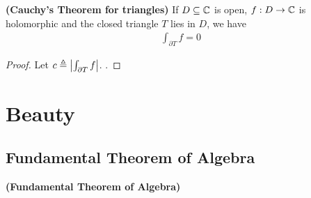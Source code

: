 \documentclass{report}
\begin{document}
\begin{theorem}
\textbf{(Cauchy's Theorem for triangles)} If $D\subseteq \mathbb{C}$ is open, $f:D\rightarrow \mathbb{C}$ is holomorphic and the closed triangle $T$ lies in $D$, we have  
\begin{align*}
\int_{\partial  T}f=0
\end{align*}
\end{theorem}
\begin{proof}
Let $c\triangleq \left|\int_{\partial  T}f\right|$. . 
\end{proof}
\chapter{Beauty}
\label{Beauty}
\section{Fundamental Theorem of Algebra}
\begin{theorem}
\textbf{(Fundamental Theorem of Algebra)}
\end{theorem}
\end{document}
